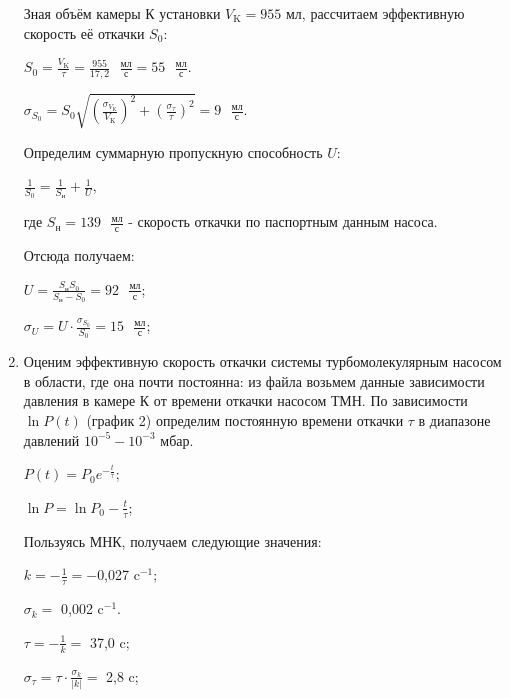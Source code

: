\documentclass[a4paper,12pt]{article} %
\begin{document}
\begin{enumerate}
\newpage
Зная объём камеры К установки $V_{\text{K}} = 955$ мл, рассчитаем эффективную скорость её откачки $S_{0}$:


$S_{0} = \frac{V_{\text{K}}}{\tau} = \frac{955}{17,2} \text{ }\frac{\text{мл}}{\text{с}} = 55 \text{ }\frac{\text{мл}}{\text{с}}$.

$\sigma_{S_{0}} = S_{0}\sqrt{\left(\frac{\sigma_{V_{\text{K}}}}{V_{\text{K}}}\right)^2 + \left(\frac{\sigma_{\tau}}{\tau}\right)^2} = 9\text{ }\frac{\text{мл}}{\text{с}}$. 

\begin{center}
\end{center}


Определим суммарную пропускную способность $U$:


$\frac{1}{S_{0}} = \frac{1}{S_{\text{н}}} + \frac{1}{U}$,

где $S_{\text{н}} = 139\text{ }\frac{\text{мл}}{\text{с}}$ - скорость откачки по паспортным данным насоса.

Отсюда получаем:

$U = \frac{S_{\text{н}}S_{0}}{S_{\text{н}} - S_{0}} = 92\text{ }\frac{\text{мл}}{\text{с}}$;

$\sigma_{U} = U \cdot\frac{\sigma_{S_{0}}}{S_{0}} = 15\text{ }\frac{\text{мл}}{\text{с}}$;

\begin{center}
\end{center}


\item Оценим эффективную скорость откачки системы турбомолекулярным насосом в области, где она почти постоянна: из файла возьмем данные зависимости давления в камере К от времени откачки насосом ТМН. По зависимости $\ln{P}(t)$ (график 2) определим постоянную времени откачки $\tau$ в диапазоне давлений $10^{-5}-10^{-3}$ мбар.

	$P(t) = P_{0}e^{-\frac{t}{\tau}}$;

	$\ln{P} = \ln{P_{0}} - \frac{t}{\tau}$;

	Пользуясь МНК, получаем следующие значения:

	$k = -\frac{1}{\tau} = -$0,027 c$^{-1}$;

	$\sigma_{k} = $ 0,002 c$^{-1}$.

	\vspace{5mm}
	$\tau = -\frac{1}{k} = $ 37,0 c;

	$\sigma_{\tau} = \tau \cdot \frac{\sigma_{k}}{|k|} = $ 2,8 c;


\end{enumerate}
\end{document}
